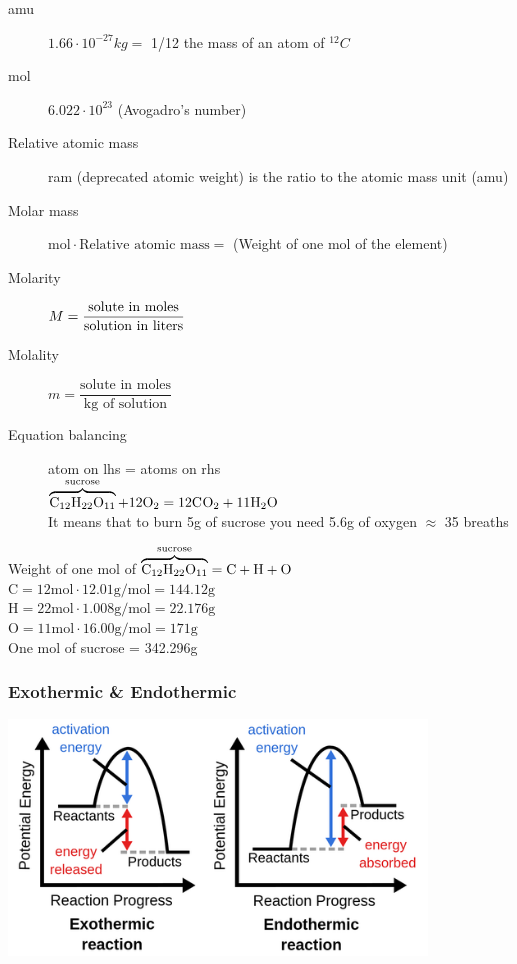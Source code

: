 \begin{description}
    \item[amu] $1.66 \cdot 10^{-27}kg =$ 1/12 the mass of an atom of $^{12}C$
    \item[mol] $6.022 \cdot 10^{23}$ (Avogadro's number)
    \item[Relative atomic mass] ram (deprecated atomic weight) is the ratio to the atomic mass unit (amu)
    \item[Molar mass] $\text{mol} \cdot \text{Relative atomic mass} =$ (Weight of one mol of the element)
    \item[Molarity] $M = \dfrac{\text{solute in moles}}{\text{solution\space in\space liters}}$
    \item[Molality]  $m = \dfrac{\text{solute in moles}}{\text{kg of solution}}$
    \item[Equation balancing] atom on lhs = atoms on rhs\\
        $\overbrace{\text{C}_{12}\text{H}_{22}\text{O}_{11}}^{\text{sucrose}} + 12\text{O}_{2} = 12\text{C}_{}\text{O}_{2} + 11\text{H}_{2}\text{O}_{}$\\
        It means that to burn 5g of sucrose you need 5.6g of oxygen $\approx$ 35 breaths
\end{description}
%
Weight of one mol of $\overbrace{\text{C}_{12}\text{H}_{22}\text{O}_{11}}^{\text{sucrose}} = \text{C} + \text{H} + \text{O}$\\
$\text{C} = 12 \text{mol} \cdot 12.01\text{g/mol} = 144.12\text{g}$\\
$\text{H} = 22 \text{mol} \cdot 1.008\text{g/mol} = 22.176\text{g}$\\
$\text{O} = 11 \text{mol} \cdot 16.00\text{g/mol} = 171\text{g}$\\
One mol of sucrose = 342.296g

\subsubsection{Exothermic \& Endothermic}
\includegraphics[width=30em]{./includes/chemistry/imgs/exo_endo.png}


